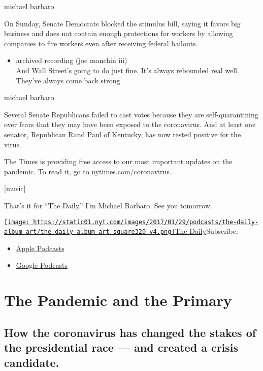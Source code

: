 michael barbaro

On Sunday, Senate Democrats blocked the stimulus bill, saying it favors
big business and does not contain enough protections for workers by
allowing companies to fire workers even after receiving federal
bailouts.

\begin{itemize}
\tightlist
\item
  archived recording (joe manchin iii)\\
  And Wall Street's going to do just fine. It's always rebounded real
  well. They've always come back strong.
\end{itemize}

michael barbaro

Several Senate Republicans failed to cast votes because they are
self-quarantining over fears that they may have been exposed to the
coronavirus. And at least one senator, Republican Rand Paul of Kentucky,
has now tested positive for the virus.

The Times is providing free access to our most important updates on the
pandemic. To read it, go to nytimes.com/coronavirus.

{[}music{]}

That's it for ``The Daily.'' I'm Michael Barbaro. See you tomorrow.

\href{https://www.nytimes.com/column/the-daily}{\texttt{[image: https://static01.nyt.com/images/2017/01/29/podcasts/the-daily-album-art/the-daily-album-art-square320-v4.png]}The
Daily}Subscribe:

\begin{itemize}
\tightlist
\item
  \href{https://itunes.apple.com/us/podcast/id1200361736}{Apple
  Podcasts}
\item
  \href{https://www.google.com/podcasts?feed=aHR0cHM6Ly9yc3MuYXJ0MTkuY29tL3RoZS1kYWlseQ\%3D\%3D}{Google
  Podcasts}
\end{itemize}

\hypertarget{the-pandemic-and-the-primary-1}{%
\section{The Pandemic and the
Primary}\label{the-pandemic-and-the-primary-1}}

\hypertarget{how-the-coronavirus-has-changed-the-stakes-of-the-presidential-race--and-created-a-crisis-candidate-1}{%
\subsection{How the coronavirus has changed the stakes of the
presidential race --- and created a crisis
candidate.}\label{how-the-coronavirus-has-changed-the-stakes-of-the-presidential-race--and-created-a-crisis-candidate-1}}

